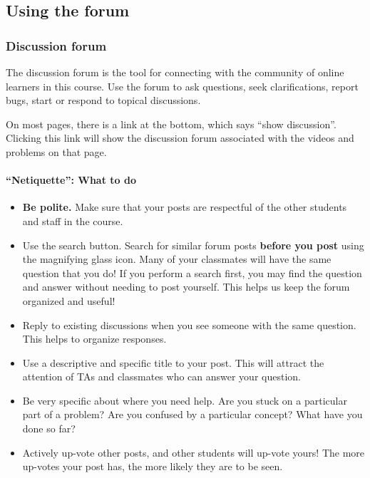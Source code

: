 \documentclass[pdftex, brazil, 12pt, twoside]{article}
\begin{document}
\subsection{Using the forum}
\label{gs-forum}

\subsubsection{Discussion forum}
\label{gs-forum-forum}

The discussion forum is the tool for connecting with the community of online learners
in this course. Use the forum to ask questions, seek clarifications, report bugs,
start or respond to topical discussions.

On most pages, there is a link at the bottom, which says ``show discussion''.
Clicking this link will show the discussion forum associated with the videos
and problems on that page.

\paragraph{``Netiquette'': What to do}

\begin{itemize}[noitemsep]
\item \textbf{Be polite.} Make sure that your posts are respectful of the other
  students and staff in the course.
\item Use the search button. Search for similar forum posts \textbf{before you
  post} using the magnifying glass icon. Many of your classmates will have the
  same question that you do! If you perform a search first, you may find the
  question and answer without needing to post yourself. This helps us keep the
  forum organized and useful!
\item Reply to existing discussions when you see someone with the same question.
  This helps to organize responses.
\item Use a descriptive and specific title to your post. This will attract the
  attention of TAs and classmates who can answer your question.
\item Be very specific about where you need help. Are you stuck on a particular
  part of a problem? Are you confused by a particular concept? What have you
  done so far?
\item Actively up-vote other posts, and other students will up-vote yours!
  The more up-votes your post has, the more likely they are to be seen.
\end{itemize}
\end{document}
